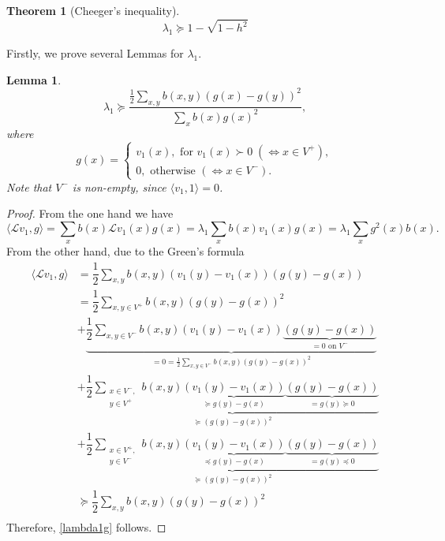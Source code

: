 \documentclass[a4paper,12pt]{amsart}
\newtheorem{theorem}{Theorem}
\newtheorem{lemma}{Lemma}
\theoremstyle{definition}
\renewcommand{\L}{\mathcal{L}}
\newcommand{\weight}{b}
\begin{document}
\begin{theorem}[Cheeger's inequality]\label{Theorem::Cheeger}
\begin{equation*}
\lambda_1\succeq 1-\sqrt{1-h^2}
\end{equation*}
\end{theorem}

Firstly, we prove several Lemmas for $\lambda_1$.

\begin{lemma}\label{Lemma:lambda1g}
\begin{equation}\label{lambda1g}
\lambda_1\succeq \dfrac{\frac{1}{2}\sum_{x,y}\weight (x,y)(g(x)-g(y))^2}{\sum_x \weight (x)g(x)^2},
\end{equation}
where
\begin{equation*}
g(x)=
\begin{cases}
v_1(x), \mbox{ for }v_1(x)\succ 0\; (\Leftrightarrow x\in V^+),\\
0, \mbox{ otherwise } (\Leftrightarrow x\in V^-).
\end{cases}
\end{equation*}
Note that $V^-$ is non-empty, since $\langle v_1, 1\rangle=0$.
\end{lemma}

\begin{proof}
From the one hand we have
\begin{equation*}
\langle\L v_1,g\rangle=\sum_x \weight (x) \L v_1(x)g(x)=\lambda_1\sum_x \weight (x)  v_1(x)g(x)=\lambda_1\sum_xg^2(x)\weight (x).
\end{equation*}
From the other hand, due to the Green's formula
\begin{align*}
\langle\L v_1,g\rangle&=\dfrac{1}{2}\sum_{x,y} \weight (x,y) (v_1(y)-v_1(x))(g(y)-g(x))\\
&=\dfrac{1}{2}\sum_{x,y\in V^+} \weight (x,y) (g(y)-g(x))^2\\
&+\underbrace{\dfrac{1}{2}\sum_{x,y\in V^-} \weight (x,y)(v_1(y)-v_1(x)) \underbrace{(g(y)-g(x))}_{=0\mbox{ on }V^-}}_{=0=\frac{1}{2}\sum_{x,y\in V^-} \weight (x,y) (g(y)-g(x))^2}\\
&+\underbrace{\dfrac{1}{2}\sum_{\substack{x\in V^-,\\y\in V^+}} \weight (x,y)\underbrace{(v_1(y)-v_1(x))}_{\succeq g(y)-g(x)} \underbrace{(g(y)-g(x))}_{=g(y)\succeq 0}}_{\succeq (g(y)-g(x))^2}\\
&+\underbrace{\dfrac{1}{2}\sum_{\substack{x\in V^+,\\y\in V^-}} \weight (x,y)\underbrace{(v_1(y)-v_1(x))}_{\preceq g(y)-g(x)} \underbrace{(g(y)-g(x))}_{=g(y)\preceq 0}}_{\succeq (g(y)-g(x))^2}\\
&\succeq\dfrac{1}{2}\sum_{x,y} \weight (x,y) (g(y)-g(x))^2\\
\end{align*}
Therefore, \eqref{lambda1g} follows.
\end{proof}
\end{document}
